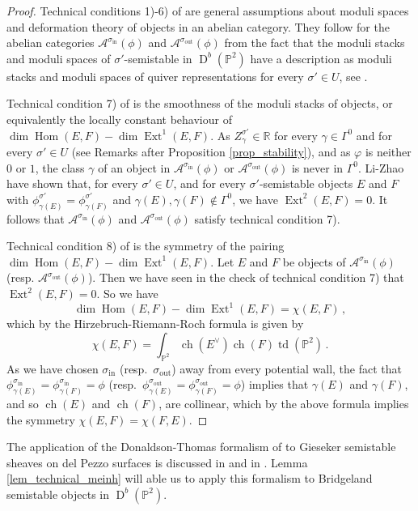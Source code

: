 \documentclass[12pt, a4paper]{amsart}
\newcommand\PP{\mathbb P}
\newcommand\R{\mathbb R}
\newcommand\cA{\mathcal A}
\newcommand\Ext{\operatorname{Ext}}
\newcommand\Hom{\operatorname{Hom}}
\newcommand\ch{\operatorname{ch}}
\newcommand\td{\operatorname{td}}
\newcommand\D{\operatorname{D}}
\newcommand\iin{\mathrm{in}}
\newcommand\oout{\mathrm{out}}
\begin{document}
\begin{proof}
Technical conditions 1)-6) of \cite{meinhardt2015donaldson} are general assumptions about moduli spaces and deformation theory of objects in an abelian category. They follow for
the abelian categories
 $\cA^{\sigma_{\iin}}(\phi)$ and 
$\cA^{\sigma_{\oout}}(\phi)$
from the fact that the moduli stacks and moduli spaces 
of $\sigma'$-semistable in $\D^b(\PP^2)$ have a description as moduli stacks and moduli spaces 
of quiver representations for every $\sigma' \in U$, see \cite[Corollary 7.6]{MR3010070}.

Technical condition 7) of \cite{meinhardt2015donaldson} is the smoothness of the moduli stacks of 
objects, or equivalently the locally constant behaviour of 
$\dim \Hom (E,F)-\dim \Ext^1(E,F)$. As $Z_\gamma^{\sigma'} \in \R$ for every $\gamma \in 
\Gamma^0$
and for every $\sigma' \in U$ (see Remarks after Proposition
\ref{prop_stability}), and as $\varphi$ is neither $0$ or $1$, the class $\gamma$ of an object in 
$\cA^{\sigma_{\iin}}(\phi)$ or 
$\cA^{\sigma_{\oout}}(\phi)$ is never in $\Gamma^0$. 
Li-Zhao \cite{MR3936077} have shown that, for every 
$\sigma' \in U$, and for every $\sigma'$-semistable objects $E$ and $F$
with $\phi_{\gamma(E)}^{\sigma'}=\phi_{\gamma(F)}^{\sigma'}$ and 
$\gamma(E), \gamma(F) \notin \Gamma^0$, we have $\Ext^2(E,F)=0$.
It follows that $\cA^{\sigma_{\iin}}(\phi)$ and 
$\cA^{\sigma_{\oout}}(\phi)$ satisfy technical condition 7).

Technical condition 8) of \cite{meinhardt2015donaldson} is the symmetry of the pairing 
$\dim \Hom(E,F)-\dim \Ext^1(E,F)$. Let $E$ and $F$ be objects of $\cA^{\sigma_{\iin}}(\phi)$ (resp. 
$\cA^{\sigma_{\oout}}(\phi)$). Then we have seen in the check of technical condition 7)
that $\Ext^2(E,F)=0$. So we have 
\[\dim \Hom(E,F)-\dim \Ext^1(E,F)=\chi(E,F)\,,\] 
which by the Hirzebruch-Riemann-Roch formula is given by
\[\chi(E, F)=\int_{\PP^2} \ch(E^\vee) \ch(F) \td(\PP^2)\,.\]
As we have chosen $\sigma_\iin$ (resp.\ $\sigma_\oout$) away from every potential wall, the fact that $\phi_{\gamma(E)}^{\sigma_\iin}=\phi_{\gamma(F)}^{\sigma_\iin}=\phi$
(resp.\ $\phi_{\gamma(E)}^{\sigma_\oout}=\phi_{\gamma(F)}^{\sigma_\oout}=\phi$)
implies that $\gamma(E)$ and $\gamma(F)$, and so $\ch(E)$ and $\ch(F)$, are collinear, 
which by the above formula implies the symmetry $\chi(E,F)=\chi(F,E)$.
\end{proof}

The application of the Donaldson-Thomas formalism of \cite{meinhardt2015donaldson} to Gieseker
semistable sheaves on del Pezzo surfaces is discussed in 
\cite[Example 3.34]{meinhardt2015donaldson} and in \cite{MR3874687}. Lemma \ref{lem_technical_meinh}
will able us to apply this formalism to Bridgeland semistable objects in $\D^b(\PP^2)$.
\end{document}
